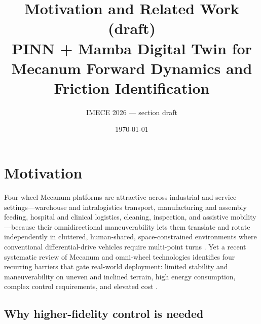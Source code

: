 \documentclass[11pt]{article}
\title{\bfseries Motivation and Related Work (draft)\\
\normalsize PINN + Mamba Digital Twin for Mecanum Forward Dynamics and Friction Identification}
\author{\normalsize IMECE 2026 --- section draft}
\date{\today}
\begin{document}
\maketitle


\section{Motivation}
\label{sec:motivation}

Four-wheel Mecanum platforms are attractive across industrial and service
settings---warehouse and intralogistics transport, manufacturing and assembly
feeding, hospital and clinical logistics, cleaning, inspection, and assistive
mobility---because their omnidirectional maneuverability lets them translate and
rotate independently in cluttered, human-shared, space-constrained environments
where conventional differential-drive vehicles require multi-point turns
\cite{burkacki2025review}. Yet a recent systematic review of Mecanum and omni-wheel
technologies identifies four recurring barriers that gate real-world deployment:
limited stability and maneuverability on uneven and inclined terrain, high energy
consumption, complex control requirements, and elevated cost \cite{burkacki2025review}.

\subsection{Why higher-fidelity control is needed}
\label{sec:why-fidelity}
\end{document}
